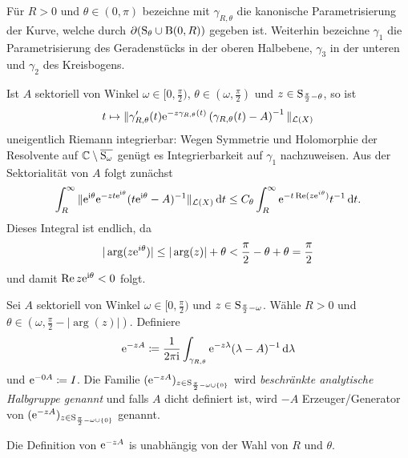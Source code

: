 \begin{ntion}
  Für $R > 0$ und $\theta \in (0,\pi)$ bezeichne mit $\gamma_{R, \theta}$ die kanonische Parametrisierung der Kurve, welche durch $\partial(\mathrm{S}_\theta \cup \mathrm{B}(0,R))$ gegeben ist.
  Weiterhin bezeichne $\gamma_1$ die Parametrisierung des Geradenstücks in der oberen Halbebene, $\gamma_3$ in der unteren und $\gamma_2$ des Kreisbogens.
\end{ntion}

\begin{obs}
  \label{obs:integrablePath}
  Ist $A$ sektoriell von Winkel $\omega \in [0,\frac{\pi}{2} )$, $\theta \in (\omega, \frac{\pi}{2})$ und $z \in \mathrm{S}_{\frac{\pi}{2} - \theta}$, so ist 
  $$
  t \mapsto \|\gamma'_{R,\theta}(t) \mathrm{e}^{-z\gamma_{R,\theta}(t)} \left( \gamma_{R, \theta}(t) - A \right)^{-1} \|_{\mathcal{L}(X)}
  $$
  uneigentlich Riemann integrierbar: 
  Wegen Symmetrie und Holomorphie der Resolvente auf $\mathbb{C} \setminus \overline{\mathrm{S}_\omega}$ genügt es Integrierbarkeit auf $\gamma_1$ nachzuweisen.
  Aus der Sektorialität von $A$ folgt zunächst
  $$
    \int_{R}^\infty \| \mathrm{e}^{\mathrm{i}\theta} \mathrm{e}^{-zt \mathrm{e}^{\mathrm{i}\theta}} ( t\mathrm{e}^{\mathrm{i}\theta} - A )^{-1} \|_{\mathcal{L}(X)} \, {\operatorname{d}\!{t}}
    \leq C_\theta \int_R^\infty \mathrm{e}^{-t \operatorname{Re}(z \mathrm{e}^{i \theta})} t^{-1} \, {\operatorname{d}\!{t}}.
  $$
  Dieses Integral ist endlich, da
  $$
  |\arg(z \mathrm{e}^{i \theta})| \leq |\arg(z)| + \theta < \frac{\pi}{2} - \theta + \theta = \frac{\pi}{2}
  $$
  und damit $\operatorname{Re}z \mathrm{e}^{\mathrm{i}\theta} < 0$ folgt.
\end{obs}

\begin{defn}
  Sei $A$ sektoriell von Winkel $\omega \in [0,\frac{\pi}{2})$ und $z \in \mathrm{S}_{\frac{\pi}{2} - \omega}$.
    Wähle $R > 0$ und $\theta \in (\omega, \frac{\pi}{2} - |\arg(z)|)$.
    Definiere
    $$
    \mathrm{e}^{-zA} \coloneqq \frac{1}{2\pi \mathrm{i}} \int_{\gamma_{R, \theta}} \mathrm{e}^{-z\lambda } (\lambda - A)^{-1} \, {\operatorname{d}\!{\lambda}}
    $$
    und $\mathrm{e}^{-0A} \coloneqq I$.
    Die Familie $(\mathrm{e}^{-zA})_{z \in \mathrm{S}_{\frac{\pi}{2} - \omega \cup \{0\}}}$  wird \emph{beschränkte analytische Halbgruppe genannt} und falls $A$ dicht definiert ist, wird $-A$ Erzeuger/Generator von $(\mathrm{e}^{-zA})_{z \in \mathrm{S}_{\frac{\pi}{2} - \omega \cup \{0\}}}$ genannt.
\end{defn}

\begin{lem}
  \label{lem:welldefinedsg}
  Die Definition von $\mathrm{e}^{-zA}$ is unabhängig von der Wahl von $R$ und $\theta$.
\end{lem}

